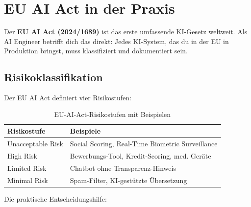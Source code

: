 \section{EU AI Act in der Praxis}
\label{sec:eu-ai-act}

Der \textbf{EU AI Act (2024/1689)} ist das erste umfassende KI-Gesetz weltweit. Als AI Engineer betrifft dich das direkt: Jedes KI-System, das du in der EU in Produktion bringst, muss klassifiziert und dokumentiert sein.

\subsection{Risikoklassifikation}

Der EU AI Act definiert vier Risikostufen:

\begin{table}[H]
\centering
\begin{tabularx}{\linewidth}{p{3cm}X}
\toprule
\textbf{Risikostufe} & \textbf{Beispiele} \\
\midrule
Unacceptable Risk & Social Scoring, Real-Time Biometric Surveillance \\
High Risk & Bewerbungs-Tool, Kredit-Scoring, med. Geräte \\
Limited Risk & Chatbot ohne Transparenz-Hinweis \\
Minimal Risk & Spam-Filter, KI-gestützte Übersetzung \\
\bottomrule
\end{tabularx}
\caption{EU-AI-Act-Risikostufen mit Beispielen}
\label{tab:eu-risk-levels}
\end{table}

Die praktische Entscheidungshilfe:

